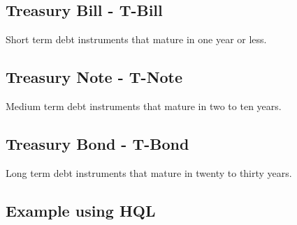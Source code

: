 \documentclass[11pt,a4paper]{article}
\numberwithin{equation}{section}
\begin{document}
	\subsection{Treasury Bill - T-Bill}
	Short term debt instruments that mature in one year or less.
	\subsection{Treasury Note - T-Note}
	Medium term debt instruments that mature in two to ten years.
	\subsection{Treasury Bond - T-Bond}
	Long term debt instruments that mature in twenty to thirty years.

	\subsection{Example using HQL}

\end{document}
